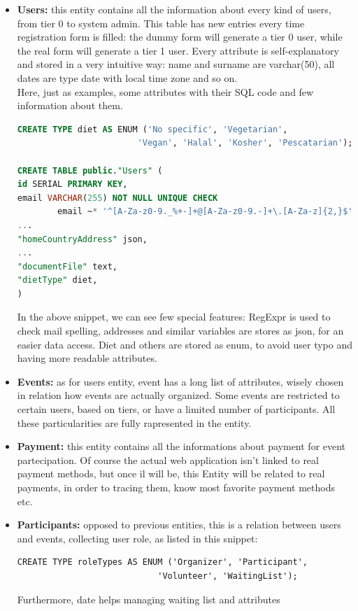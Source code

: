 \begin{itemize}
    \item \textbf{Users:} this entity contains all the information about every kind of users, from
    tier 0 to system admin. This table has new entries every time registration form is filled: the dummy
    form will generate a tier 0 user, while the real form will generate a tier 1 user. Every attribute 
    is self-explanatory and stored in a very intuitive way: name and surname are varchar(50), all dates
    are type date with local time zone and so on.\\
    Here, just as examples, some attributes with their SQL code and few information about them.
\begin{lstlisting}[language=SQL]
CREATE TYPE diet AS ENUM ('No specific', 'Vegetarian',
                        'Vegan', 'Halal', 'Kosher', 'Pescatarian');

CREATE TABLE public."Users" (
id SERIAL PRIMARY KEY,
email VARCHAR(255) NOT NULL UNIQUE CHECK 
        email ~* '^[A-Za-z0-9._%+-]+@[A-Za-z0-9.-]+\.[A-Za-z]{2,}$'),
...
"homeCountryAddress" json,
...
"documentFile" text,
"dietType" diet,
)
\end{lstlisting}
    In the above snippet, we can see few special features: RegExpr is used to check mail spelling,
    addresses and similar variables are stores as json, for an easier data access. Diet and others
    are stored as enum, to avoid user typo and having more readable attributes. %
    \item \textbf{Events:} as for users entity, event has a long list of attributes, wisely chosen
    in relation how events are actually organized. Some events are restricted to certain users, based
    on tiers, or have a limited number of participants. All these particularities are fully rapresented
    in the entity.
    \item \textbf{Payment:} this entity contains all the informations about payment for event partecipation.
    Of course the actual web application isn't linked to real payment methods, but once il will be, this Entity
    will be related to real payments, in order to tracing them, know most favorite payment methods etc.
    \item \textbf{Participants:} opposed to previous entities, this is a relation between users and events,
    collecting user role, as listed in this snippet:
\begin{lstlisting}
CREATE TYPE roleTypes AS ENUM ('Organizer', 'Participant',
                            'Volunteer', 'WaitingList');
\end{lstlisting}
    Furthermore, date helps managing waiting list and attributes %
\end{itemize}